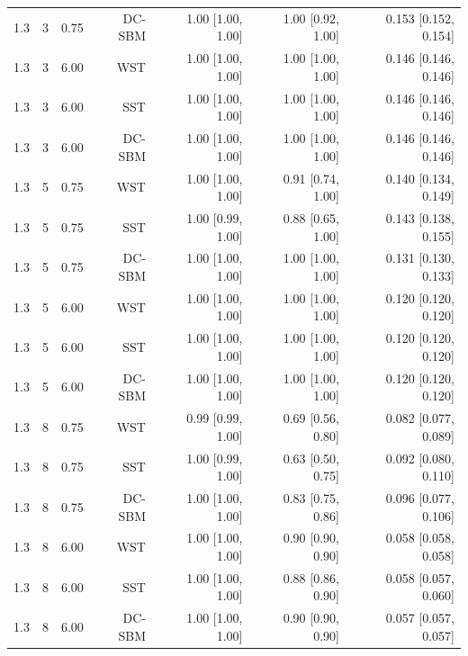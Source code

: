 \begin{table}[!h]
\begin{tabular}[t]{rrrrrrr}
1.3 & 3 & 0.75 & DC-SBM & 1.00 [1.00, 1.00] & 1.00 [0.92, 1.00] & 0.153 [0.152, 0.154]\\
1.3 & 3 & 6.00 & WST & 1.00 [1.00, 1.00] & 1.00 [1.00, 1.00] & 0.146 [0.146, 0.146]\\
1.3 & 3 & 6.00 & SST & 1.00 [1.00, 1.00] & 1.00 [1.00, 1.00] & 0.146 [0.146, 0.146]\\
1.3 & 3 & 6.00 & DC-SBM & 1.00 [1.00, 1.00] & 1.00 [1.00, 1.00] & 0.146 [0.146, 0.146]\\
1.3 & 5 & 0.75 & WST & 1.00 [1.00, 1.00] & 0.91 [0.74, 1.00] & 0.140 [0.134, 0.149]\\
1.3 & 5 & 0.75 & SST & 1.00 [0.99, 1.00] & 0.88 [0.65, 1.00] & 0.143 [0.138, 0.155]\\
1.3 & 5 & 0.75 & DC-SBM & 1.00 [1.00, 1.00] & 1.00 [1.00, 1.00] & 0.131 [0.130, 0.133]\\
1.3 & 5 & 6.00 & WST & 1.00 [1.00, 1.00] & 1.00 [1.00, 1.00] & 0.120 [0.120, 0.120]\\
1.3 & 5 & 6.00 & SST & 1.00 [1.00, 1.00] & 1.00 [1.00, 1.00] & 0.120 [0.120, 0.120]\\
1.3 & 5 & 6.00 & DC-SBM & 1.00 [1.00, 1.00] & 1.00 [1.00, 1.00] & 0.120 [0.120, 0.120]\\
1.3 & 8 & 0.75 & WST & 0.99 [0.99, 1.00] & 0.69 [0.56, 0.80] & 0.082 [0.077, 0.089]\\
1.3 & 8 & 0.75 & SST & 1.00 [0.99, 1.00] & 0.63 [0.50, 0.75] & 0.092 [0.080, 0.110]\\
1.3 & 8 & 0.75 & DC-SBM & 1.00 [1.00, 1.00] & 0.83 [0.75, 0.86] & 0.096 [0.077, 0.106]\\
1.3 & 8 & 6.00 & WST & 1.00 [1.00, 1.00] & 0.90 [0.90, 0.90] & 0.058 [0.058, 0.058]\\
1.3 & 8 & 6.00 & SST & 1.00 [1.00, 1.00] & 0.88 [0.86, 0.90] & 0.058 [0.057, 0.060]\\
1.3 & 8 & 6.00 & DC-SBM & 1.00 [1.00, 1.00] & 0.90 [0.90, 0.90] & 0.057 [0.057, 0.057]\\
\bottomrule
\end{tabular}
\end{table}
